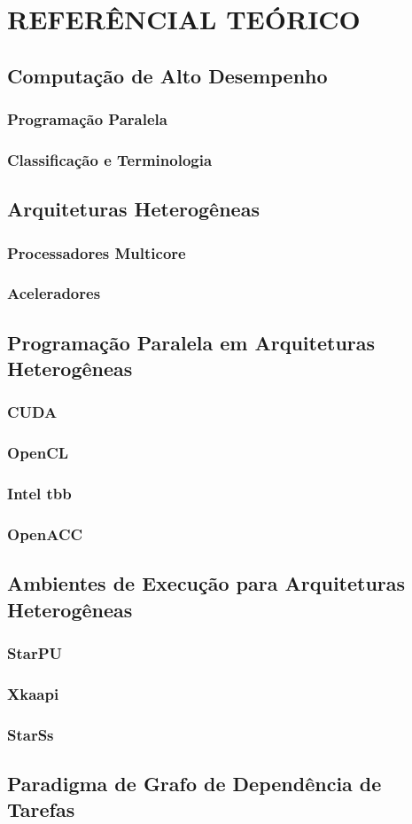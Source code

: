 
\chapter{REFERÊNCIAL TEÓRICO}
\label{chap:ref-teorico}

\section{Computação de Alto Desempenho}
\subsection{Programação Paralela}
\subsection{Classificação e Terminologia}

\section{Arquiteturas Heterogêneas}
\subsection{Processadores Multicore}
\subsection{Aceleradores}

\section{Programação Paralela em Arquiteturas Heterogêneas}
\subsection{CUDA}
\subsection{OpenCL}
\subsection{Intel tbb}
\subsection{OpenACC}

\section{Ambientes de Execução para Arquiteturas Heterogêneas}
\subsection{StarPU}
\subsection{Xkaapi}
\subsection{StarSs}

\section{Paradigma de Grafo de Dependência de Tarefas}